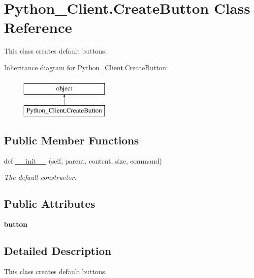 \hypertarget{class_python___client_1_1_create_button}{}\section{Python\+\_\+\+Client.\+Create\+Button Class Reference}
\label{class_python___client_1_1_create_button}


This class creates default buttons.  


Inheritance diagram for Python\+\_\+\+Client.\+Create\+Button\+:\begin{figure}[H]
\begin{center}
\leavevmode
\includegraphics[height=2.000000cm]{class_python___client_1_1_create_button}
\end{center}
\end{figure}
\subsection*{Public Member Functions}
\begin{DoxyCompactItemize}
\item 
def \mbox{\hyperlink{class_python___client_1_1_create_button_ab0e1f7597f08c6abc36ebb034b228811}{\+\_\+\+\_\+init\+\_\+\+\_\+}} (self, parent, content, size, command)
\begin{DoxyCompactList}\small\item\em The default constructor. \end{DoxyCompactList}\end{DoxyCompactItemize}
\subsection*{Public Attributes}
\begin{DoxyCompactItemize}
\item 
\mbox{\label{class_python___client_1_1_create_button_a78b040d7f0a668fc2c26ba8874cc2de6}} 
{\bfseries button}
\end{DoxyCompactItemize}


\subsection{Detailed Description}
This class creates default buttons. 


